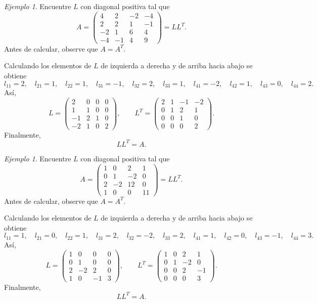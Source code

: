 \documentclass[12pt]{article}
\theoremstyle{remark}
\newtheorem{Ejem}[definicion]{Ejemplo}
\begin{document}
\begin{Ejem}
Encuentre $L$ con diagonal positiva tal que
\[
A=\begin{pmatrix}4 & 2 & -2 & -4\\2 & 2 & 1 & -1\\-2 & 1 & 6 & 4\\-4 & -1 & 4 & 9\end{pmatrix}=LL^T.
\]
Antes de calcular, observe que $A=A^T$.

Calculando los elementos de $L$ de izquierda a derecha y de arriba hacia abajo se obtiene
\[
l_{11}=2,\quad l_{21}=1,\quad l_{22}=1,\quad l_{31}=-1,\quad l_{32}=2,\quad l_{33}=1,\quad l_{41}=-2,\quad l_{42}=1,\quad l_{43}=0,\quad l_{44}=2.
\]
Así,
\[
L=\begin{pmatrix}2 & 0 & 0 & 0\\1 & 1 & 0 & 0\\-1 & 2 & 1 & 0\\-2 & 1 & 0 & 2\end{pmatrix},\qquad L^T=\begin{pmatrix}2 & 1 & -1 & -2\\0 & 1 & 2 & 1\\0 & 0 & 1 & 0\\0 & 0 & 0 & 2\end{pmatrix}.
\]
Finalmente,
\[
\boxed{LL^T=A}.
\]

\end{Ejem}

\begin{Ejem}

Encuentre $L$ con diagonal positiva tal que
\[
A=\begin{pmatrix}1 & 0 & 2 & 1\\0 & 1 & -2 & 0\\2 & -2 & 12 & 0\\1 & 0 & 0 & 11\end{pmatrix}=LL^T.
\]
Antes de calcular, observe que $A=A^T$.


Calculando los elementos de $L$ de izquierda a derecha y de arriba hacia abajo se obtiene
\[
l_{11}=1,\quad l_{21}=0,\quad l_{22}=1,\quad l_{31}=2,\quad l_{32}=-2,\quad l_{33}=2,\quad l_{41}=1,\quad l_{42}=0,\quad l_{43}=-1,\quad l_{44}=3.
\]
Así,
\[
L=\begin{pmatrix}1 & 0 & 0 & 0\\0 & 1 & 0 & 0\\2 & -2 & 2 & 0\\1 & 0 & -1 & 3\end{pmatrix},\qquad L^T=\begin{pmatrix}1 & 0 & 2 & 1\\0 & 1 & -2 & 0\\0 & 0 & 2 & -1\\0 & 0 & 0 & 3\end{pmatrix}.
\]
Finalmente,
\[
\boxed{LL^T=A}.
\]
\end{Ejem}
\end{document}
